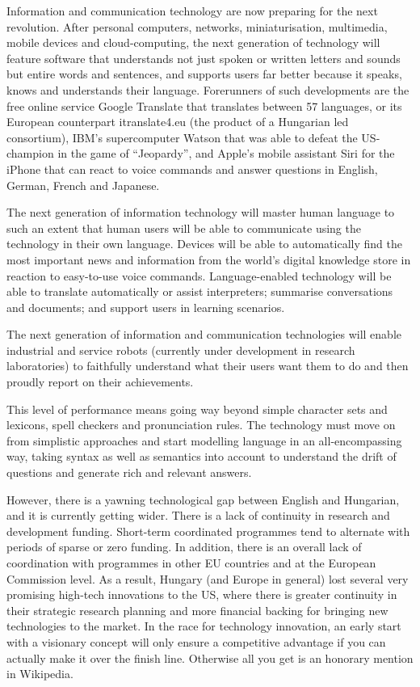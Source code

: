 \begin{multicols}{2}
Information and communication technology are now preparing for the next revolution. After personal computers, networks, miniaturisation, multimedia, mobile devices and cloud-computing, the next generation of technology will feature software that understands not just spoken or written letters and sounds but entire words and sentences, and supports users far better because it speaks, knows and understands their language. Forerunners of such developments are the free online service Google Translate that translates between 57 languages, or its European counterpart itranslate4.eu (the product of a Hungarian led consortium), IBM’s supercomputer Watson that was able to defeat the US-champion in the game of “Jeopardy”, and Apple’s mobile assistant Siri for the iPhone that can react to voice commands and answer questions in English, German, French and Japanese. 

The next generation of information technology will master human language to such an extent that human users will be able to communicate using the technology in their own language. Devices will be able to automatically find the most important news and information from the world’s digital knowledge store in reaction to easy-to-use voice commands. Language-enabled technology will be able to translate automatically or assist interpreters; summarise conversations and documents;  and support users in learning scenarios. 

The next generation of information and communication technologies will enable industrial and service robots (currently under development in research laboratories) to faithfully understand what their users want them to do and then proudly report on their achievements.  

This level of performance means going way beyond simple character sets and lexicons, spell checkers and pronunciation rules. The technology must move on from simplistic approaches and start modelling language in an all-encompassing way, taking syntax as well as semantics into account to understand the drift of questions and generate rich and relevant answers.

However, there is a yawning technological gap between English and Hungarian, and it is currently getting wider. There is a lack of continuity in research and development funding. Short-term coordinated programmes tend to alternate with periods of sparse or zero funding. In addition, there is an overall lack of coordination with programmes in other EU countries and at the European Commission level. As a result, Hungary (and Europe in general) lost several very promising high-tech innovations to the US, where there is greater continuity in their strategic research planning and more financial backing for bringing new technologies to the market. In the race for technology innovation, an early start with a visionary concept will only ensure a competitive advantage if you can actually make it over the finish line. Otherwise all you get is an honorary mention in Wikipedia.


\end{multicols}
